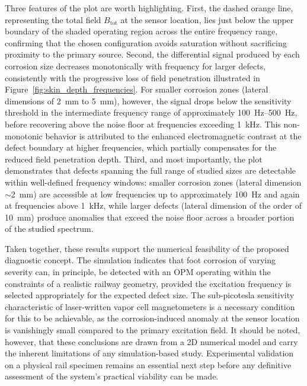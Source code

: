 Three features of the plot are worth highlighting. First, the dashed
orange line, representing the total field $B_{\mathrm{tot}}$ at the sensor
location, lies just below the upper boundary of the shaded operating
region across the entire frequency range, confirming that the chosen
configuration avoids saturation without sacrificing proximity to the
primary source. Second, the differential signal produced by each corrosion
size decreases monotonically with frequency for larger defects, consistently
with the progressive loss of field penetration illustrated in
Figure~\ref{fig:skin_depth_frequencies}. For smaller corrosion zones
(lateral dimensions of \SI{2}{\milli\meter} to \SI{5}{\milli\meter}),
however, the signal drops below the sensitivity threshold in the
intermediate frequency range of approximately \SIrange{100}{500}{\hertz},
before recovering above the noise floor at frequencies exceeding
\SI{1}{\kilo\hertz}. This non-monotonic behavior is attributed to the
enhanced electromagnetic contrast at the defect boundary at higher
frequencies, which partially compensates for the reduced field penetration
depth. Third, and most importantly, the plot demonstrates that defects
spanning the full range of studied sizes are detectable within well-defined
frequency windows: smaller corrosion zones (lateral dimension
$\sim$\SI{2}{\milli\meter}) are accessible at low frequencies up to
approximately \SI{100}{\hertz} and again at frequencies above
\SI{1}{\kilo\hertz}, while larger defects (lateral dimension of the order
of \SI{10}{\milli\meter}) produce anomalies that exceed the noise floor
across a broader portion of the studied spectrum.

Taken together, these results support the numerical feasibility of the
proposed diagnostic concept. The simulation indicates that foot corrosion
of varying severity can, in principle, be detected with an OPM operating
within the constraints of a realistic railway geometry, provided the
excitation frequency is selected appropriately for the expected defect
size. The sub-picotesla sensitivity characteristic of laser-written vapor
cell magnetometers is a necessary condition for this to be achievable, as
the corrosion-induced anomaly at the sensor location is vanishingly small
compared to the primary excitation field. It should be noted, however, that
these conclusions are drawn from a 2D numerical model and carry the
inherent limitations of any simulation-based study. Experimental validation
on a physical rail specimen remains an essential next step before any
definitive assessment of the system's practical viability can be made.